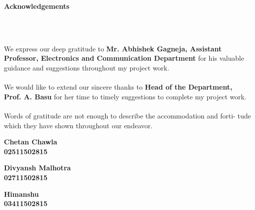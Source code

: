 \begin{center}
\thispagestyle{empty}
\LARGE{\textbf{Acknowledgements}}\\[1cm]
\end{center}
\linespread{1.13}
\\
\\
 \large{We express our deep gratitude to \textbf{Mr. Abhishek Gagneja, Assistant Professor, Electronics and Communication Department} for his valuable guidance and suggestions throughout my project work. 
\\
\\
We would like to extend our sincere thanks to \textbf{Head of the Department,} \textbf{Prof. A. Basu} for her time to timely suggestions to complete my project work.
\\
\\
Words  of  gratitude  are  not  enough  to  describe  the  accommodation  and  forti-
tude which they have shown throughout our endeavor.
\vspace{2in}
\\
\begin{minipage}{0.35\linewidth}
\begin{center}
\textbf{Chetan Chawla\\
02511502815}
\end{center}
\end{minipage}
\begin{minipage}{0.30\linewidth}
\begin{center}
\textbf{Divyansh Malhotra\\
02711502815}    
\end{center}
\end{minipage}
\begin{minipage}{0.30\linewidth}
\begin{center}
\textbf{Himanshu\\
03411502815}    
\end{center}
\end{minipage}
\vspace{0.2in}
\\
}
